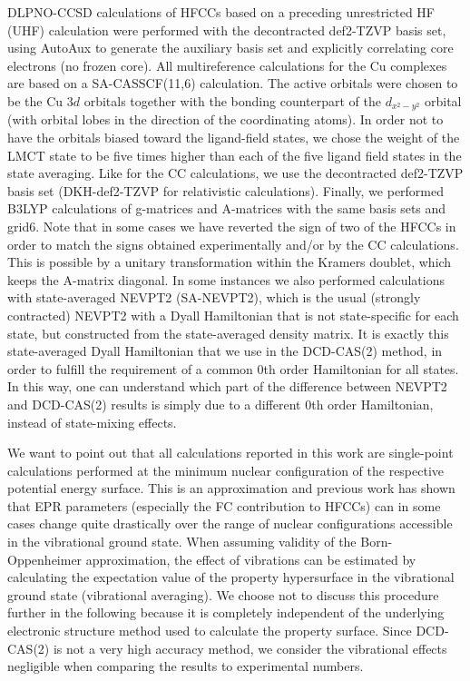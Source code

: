 DLPNO-CCSD calculations of HFCCs\cite{SaitoN_2018_34104} based on a preceding unrestricted HF (UHF) calculation were performed with the decontracted def2-TZVP basis set, using AutoAux\cite{StoycAN_2017_554} to generate the auxiliary basis set and explicitly correlating core electrons (no frozen core).
All multireference calculations for the Cu complexes are based on a SA-CASSCF(11,6) calculation. The active orbitals were chosen to be the Cu $3d$ orbitals together with the bonding counterpart of the ${d_{{x^2} - {y^2}}}$ orbital (with orbital lobes in the direction of the coordinating atoms). In order not to have the orbitals biased toward the ligand-field states, we chose the weight of the LMCT state to be five times higher than each of the five ligand field states in the state averaging. Like for the CC calculations, we use the decontracted def2-TZVP basis set (DKH-def2-TZVP for relativistic calculations). Finally, we performed B3LYP\cite{StephDCF_1994_11623} calculations of g-matrices\cite{Neese_2001_11080} and A-matrices\cite{Neese_2003_3939} with the same basis sets and grid6.
Note that in some cases we have reverted the sign of two of the HFCCs in order to match the signs obtained experimentally and/or by the CC calculations. This is possible by a unitary transformation within the Kramers doublet, which keeps the A-matrix diagonal.
In some instances we also performed calculations with state-averaged NEVPT2 (SA-NEVPT2), which is the usual (strongly contracted) NEVPT2 with a Dyall Hamiltonian that is not state-specific for each state, but constructed from the state-averaged density matrix. It is exactly this state-averaged Dyall Hamiltonian that we use in the DCD-CAS(2) method, in order to fulfill the requirement of a common 0th order Hamiltonian for all states. In this way, one can understand which part of the difference between NEVPT2 and DCD-CAS(2) results is simply due to a different 0th order Hamiltonian, instead of state-mixing effects.

We want to point out that all calculations reported in this work are single-point calculations performed at the minimum nuclear configuration of the respective potential energy surface. This is an approximation and previous work has shown that EPR parameters (especially the FC contribution to HFCCs) can in some cases change quite drastically over the range of nuclear configurations accessible in the vibrational ground state.\cite{Chipm_1983_3112, Carmi_1987_351, BaronGMS_1993_6787, GilkaTM_2008_258} When assuming validity of the Born-Oppenheimer approximation, the effect of vibrations can be estimated by calculating the expectation value of the property hypersurface in the vibrational ground state (vibrational averaging). We choose not to discuss this procedure further in the following because it is completely independent of the underlying electronic structure method used to calculate the property surface. Since DCD-CAS(2) is not a very high accuracy method, we consider the vibrational effects negligible when comparing the results to experimental numbers. 

